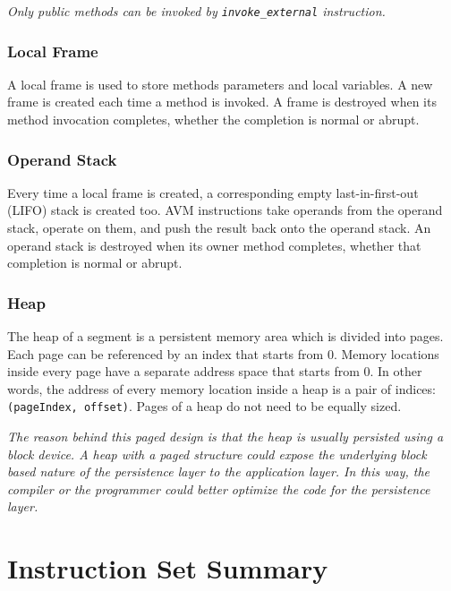 \documentclass[11pt]{article}
\begin{document}
    \emph{Only public methods can be invoked by \texttt{invoke\_external} instruction.}

    \subsubsection{Local Frame}

    A local frame is used to store methods parameters and local variables.
    A new frame is created each time a method is invoked.
    A frame is destroyed when its method invocation completes, whether the completion is normal or abrupt.

    \subsubsection{Operand Stack}

    Every time a local frame is created, a corresponding empty last-in-first-out (LIFO) stack is created too.
    AVM instructions take operands from the operand stack, operate on them, and push the result back onto the operand
    stack.
    An operand stack is destroyed when its owner method completes, whether that completion is normal or abrupt.

    \subsubsection{Heap}

    The heap of a segment is a persistent memory area which is divided into pages.
    Each page can be referenced by an index that starts from 0.
    Memory locations inside every page have a separate address space that starts from 0.
    In other words, the address of every memory location inside a heap is a pair of indices: \texttt{(pageIndex,
        offset)}.
    Pages of a heap do not need to be equally sized.

    \emph{The reason behind this paged design is that the heap is usually persisted using a block device. A heap with
    a paged
    structure could expose the underlying block based nature of the persistence layer to the application layer. In
    this way, the compiler or the programmer could better optimize the code for the persistence layer.}


    \section{Instruction Set Summary}\label{subsec:instruction-set-summary}
\end{document}
